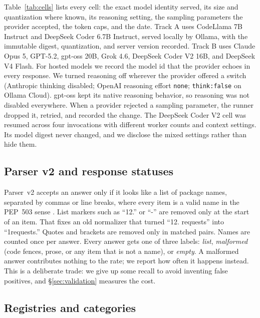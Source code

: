 \documentclass[10pt,twocolumn,letterpaper]{article}
\begin{document}
Table~\ref{tab:cells} lists every cell: the exact model identity served, its size and quantization
where known, its reasoning setting, the sampling parameters the provider accepted, the token caps,
and the date. Track A uses CodeLlama 7B Instruct and DeepSeek Coder 6.7B Instruct, served locally by
Ollama, with the immutable digest, quantization, and server version recorded. Track B uses Claude
Opus 5, GPT-5.2, gpt-oss 20B, Grok 4.6, DeepSeek Coder V2 16B, and DeepSeek V4 Flash. For hosted
models we record the model id that the provider echoes in every response. We turned reasoning off
wherever the provider offered a switch (Anthropic thinking disabled; OpenAI reasoning effort
\texttt{none}; \texttt{think:false} on Ollama Cloud). gpt-oss kept its native reasoning behavior, so
reasoning was not disabled everywhere. When a provider rejected a sampling parameter, the runner
dropped it, retried, and recorded the change. The DeepSeek Coder V2 cell was resumed across four
invocations with different worker counts and context settings. Its model digest never changed, and we
disclose the mixed settings rather than hide them.



\subsection{Parser v2 and response statuses}
\label{sec:instrument}

Parser~v2 accepts an answer only if it looks like a list of package names, separated by commas or
line breaks, where every item is a valid name in the PEP~503 sense \citep{pep503}. List markers such
as ``12.'' or ``-'' are removed only at the start of an item. That fixes an old normalizer that turned
``12. requests'' into ``1requests.'' Quotes and brackets are removed only in matched pairs. Names are
counted once per answer. Every answer gets one of three labels: \emph{list}, \emph{malformed} (code
fences, prose, or any item that is not a name), or \emph{empty}. A malformed answer contributes
nothing to the rate; we report how often it happens instead. This is a deliberate trade: we give up
some recall to avoid inventing false positives, and \S\ref{sec:validation} measures the cost.

\subsection{Registries and categories}
\end{document}
